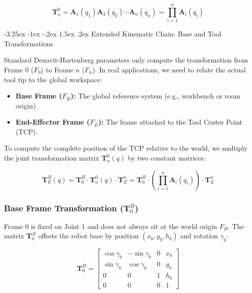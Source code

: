 \documentclass[11pt, a4paper]{article}
\makeatletter
\renewcommand{\subsection}{\@startsection{subsection}{2}{\z@}%
    {-3.25ex \@plus -1ex \@minus -.2ex}%
    {1.5ex \@plus .2ex}%
    {\normalfont\large\bfseries\color{brandaccent}}}
\makeatother
\begin{document}
\begin{equation}
    \mathbf{T}_n^0 = \mathbf{A}_1(q_1) \mathbf{A}_2(q_2) \cdots \mathbf{A}_n(q_n) = \prod_{i=1}^{n} \mathbf{A}_i(q_i)
\end{equation}

\subsection{Extended Kinematic Chain: Base and Tool Transformations}

Standard Denavit-Hartenberg parameters only compute the transformation from Frame $0$ ($F_0$) to Frame $n$ ($F_n$). In real applications, we need to relate the actual tool tip to the global workspace:
\begin{itemize}[leftmargin=1.5em]
    \item \textbf{Base Frame ($F_B$):} The global reference system (e.g., workbench or room origin).
    \item \textbf{End-Effector Frame ($F_E$):} The frame attached to the Tool Center Point (TCP).
\end{itemize}

To compute the complete position of the TCP relative to the world, we multiply the joint transformation matrix $\mathbf{T}_n^0(q)$ by two constant matrices:

\begin{equation}
    \mathbf{T}_E^B(q) = \mathbf{T}_0^B \cdot \mathbf{T}_n^0(q) \cdot \mathbf{T}_E^n = \mathbf{T}_0^B \cdot \left( \prod_{i=1}^{n} \mathbf{A}_i(q_i) \right) \cdot \mathbf{T}_E^n
\end{equation}

\subsubsection{Base Frame Transformation \texorpdfstring{($\mathbf{T}_0^B$)}{(T0B)}}
Frame $0$ is fixed on Joint 1 and does not always sit at the world origin $F_B$. The matrix $\mathbf{T}_0^B$ offsets the robot base by position $(x_b, y_b, h_b)$ and rotation $\gamma_b$:

\begin{equation}
\mathbf{T}_0^B = 
\begin{bmatrix} 
\cos\gamma_b & -\sin\gamma_b & 0 & x_b \\ 
\sin\gamma_b &  \cos\gamma_b & 0 & y_b \\ 
0            &  0           & 1 & h_b \\ 
0            &  0           & 0 & 1 
\end{bmatrix}
\end{equation}
\end{document}
